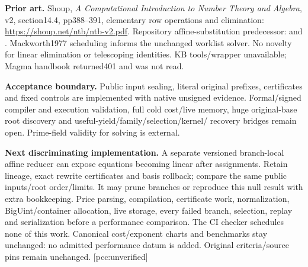 \documentclass[10pt]{article}
\begin{document}
\textbf{Prior art.} Shoup, \emph{A Computational Introduction to Number Theory
and Algebra}, v2, section14.4, pp388--391, elementary row operations and
elimination: \url{https://shoup.net/ntb/ntb-v2.pdf}.
Repository affine-substitution predecessor:
and . Mackworth1977 scheduling informs the unchanged
worklist solver. No novelty for linear elimination or telescoping identities.
KB tools/wrapper unavailable; Magma handbook returned401 and was not read.

\textbf{Acceptance boundary.} Public input sealing, literal original prefixes,
certificates and fixed controls are implemented with native unsigned evidence.
Formal/signed compiler and execution validation, full cold cost/live memory,
huge original-base root discovery and useful-yield/family/selection/kernel/
recovery bridges remain open. Prime-field validity for solving is external.

\textbf{Next discriminating implementation.} A separate versioned branch-local
affine reducer can expose equations becoming linear after assignments. Retain
lineage, exact rewrite certificates and basis rollback; compare the same public
inputs/root order/limits. It may prune branches or reproduce this null result
with extra bookkeeping. Price parsing, compilation, certificate work,
normalization, BigUint/container allocation, live storage, every failed branch,
selection, replay and serialization before a performance comparison. The CI
checker schedules none of this work. Canonical cost/exponent charts and
benchmarks stay unchanged: no admitted performance datum is added.
Original criteria/source pins remain unchanged. [pcc:unverified]
\end{document}
